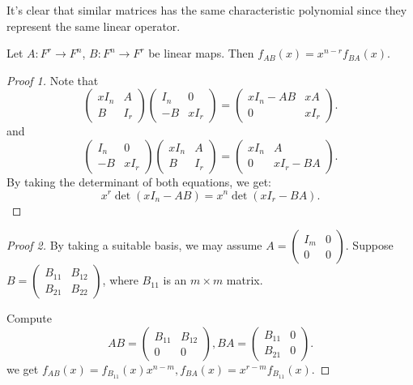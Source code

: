 It's clear that similar matrices has the same characteristic polynomial
since they represent the same linear operator.

\begin{lemma}
	Let $A:F^r\to F^n$,  $B:F^n\to F^r$ be linear maps.
	Then $f_{AB}(x)=x^{n-r}f_{BA}(x)$.
\end{lemma}
\begin{proof}[Proof 1]
	Note that
    \[
    \begin{pmatrix}
		xI_n &A\\ B &I_r
    \end{pmatrix}
	\begin{pmatrix}
		I_n &0\\ -B &xI_r
	\end{pmatrix}
	=
	\begin{pmatrix}
		xI_n - AB &xA\\ 0 &xI_r
	\end{pmatrix}.
    \]
    and
	\[
	\begin{pmatrix}
		I_n &0\\ -B &xI_r
	\end{pmatrix}
	\begin{pmatrix}
		xI_n &A\\ B &I_r
	\end{pmatrix}
	=
	\begin{pmatrix}
		xI_n &A\\ 0 &xI_r -BA
	\end{pmatrix}.
	\]
	By taking the determinant of both equations, we get:
	\[
	x^r \det(xI_n - AB) = x^n \det(xI_r - BA).
	\]
\end{proof}
\begin{proof}[Proof 2]
    By taking a suitable basis, we may assume $A=\begin{pmatrix}
		I_m &0 \\ 0 &0 \end{pmatrix}$.
	Suppose $B=\begin{pmatrix}
		B_{11} &B_{12}\\ B_{21} &B_{22}
	\end{pmatrix}$, where $B_{11}$ is an $m \times m$ matrix.

	Compute
	\[
	AB = \begin{pmatrix}
		B_{11} &B_{12}\\0 &0
	\end{pmatrix},
	BA = \begin{pmatrix}
		B_{11} &0 \\ B_{21} &0
	\end{pmatrix}.
	\]
	we get $f_{AB}(x) = f_{B_{11}}(x)x^{n-m}, f_{BA}(x) =x^{r-m}f_{B_{11}}(x)$.
\end{proof}

